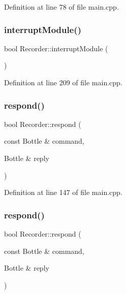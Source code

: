Definition at line 78 of file main.\+cpp.

\mbox{\label{classRecorder_acaea9fb8ce689c0e6fdfdd451c42e391}} 
\subsubsection{\texorpdfstring{interrupt\+Module()}{interruptModule()}}
{\footnotesize\ttfamily bool Recorder\+::interrupt\+Module (\begin{DoxyParamCaption}{ }\end{DoxyParamCaption})\hspace{0.3cm}{\ttfamily [inline]}}



Definition at line 209 of file main.\+cpp.

\mbox{\label{classRecorder_adfaba3907e14d55a702b3935d894d1f1}} 
\subsubsection{\texorpdfstring{respond()}{respond()}\hspace{0.1cm}{\footnotesize\ttfamily [1/2]}}
{\footnotesize\ttfamily bool Recorder\+::respond (\begin{DoxyParamCaption}\item[{const Bottle \&}]{command,  }\item[{Bottle \&}]{reply }\end{DoxyParamCaption})\hspace{0.3cm}{\ttfamily [inline]}}



Definition at line 147 of file main.\+cpp.

\mbox{\label{classRecorder_adfaba3907e14d55a702b3935d894d1f1}} 
\subsubsection{\texorpdfstring{respond()}{respond()}\hspace{0.1cm}{\footnotesize\ttfamily [2/2]}}
{\footnotesize\ttfamily bool Recorder\+::respond (\begin{DoxyParamCaption}\item[{const Bottle \&}]{command,  }\item[{Bottle \&}]{reply }\end{DoxyParamCaption})\hspace{0.3cm}{\ttfamily [inline]}}



